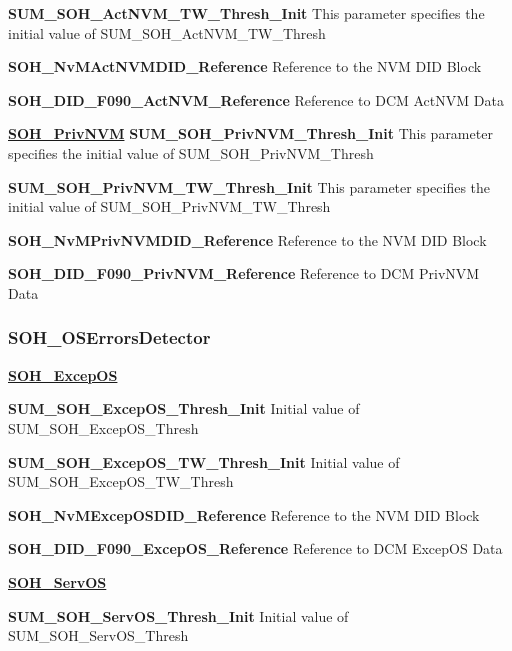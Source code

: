 \textbf{SUM\_SOH\_ActNVM\_TW\_Thresh\_Init}\newline
This parameter specifies the initial value of SUM\_SOH\_ActNVM\_TW\_Thresh


\textbf{SOH\_NvMActNVMDID\_Reference}\newline
Reference to the NVM DID Block

\textbf{SOH\_DID\_F090\_ActNVM\_Reference}\newline
Reference to DCM ActNVM Data

\textbf{\underline{SOH\_PrivNVM}}\newline
\textbf{SUM\_SOH\_PrivNVM\_Thresh\_Init}\newline
This parameter specifies the initial value of SUM\_SOH\_PrivNVM\_Thresh


\textbf{SUM\_SOH\_PrivNVM\_TW\_Thresh\_Init}\newline
This parameter specifies the initial value of SUM\_SOH\_PrivNVM\_TW\_Thresh


\textbf{SOH\_NvMPrivNVMDID\_Reference}\newline
Reference to the NVM DID Block

\textbf{SOH\_DID\_F090\_PrivNVM\_Reference}\newline
Reference to DCM PrivNVM Data

\subsubsection{SOH\_OSErrorsDetector}
\textbf{\underline{SOH\_ExcepOS}}\newline

\textbf{SUM\_SOH\_ExcepOS\_Thresh\_Init}\newline
Initial value of SUM\_SOH\_ExcepOS\_Thresh

\textbf{SUM\_SOH\_ExcepOS\_TW\_Thresh\_Init}\newline
Initial value of SUM\_SOH\_ExcepOS\_TW\_Thresh

\textbf{SOH\_NvMExcepOSDID\_Reference}\newline
Reference to the NVM DID Block

\textbf{SOH\_DID\_F090\_ExcepOS\_Reference}\newline
Reference to DCM ExcepOS Data

\textbf{\underline{SOH\_ServOS}}\newline


\textbf{SUM\_SOH\_ServOS\_Thresh\_Init}\newline
Initial value of SUM\_SOH\_ServOS\_Thresh

